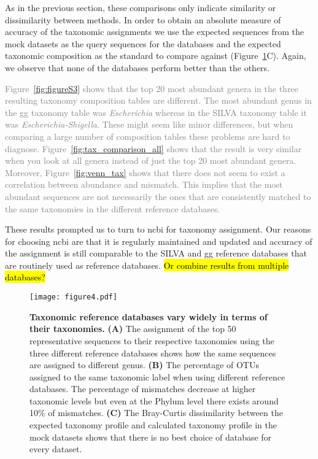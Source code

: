   As in the previous section, these comparisons only indicate similarity or dissimilarity between methods.
  In order to obtain an absolute measure of accuracy of the taxonomic assignments we use the expected sequences from the mock datasets as the query sequences for the databases and the expected taxonomic composition as the standard to compare against (Figure~\ref{fig:figure4}C).
  Again, we observe that none of the databases perform better than the others. 

  \textcolor{gray}{
    Figure~\ref{fig:figureS3} shows that the top 20 most abundant genera in the three resulting taxonomy composition tables are different.
    The most abundant genus in the \ac{gg} taxonomy table was \textit{Escherichia} whereas in the SILVA taxonomy table it was \textit{Escherichia-Shigella}.
    These might seem like minor differences, but when comparing a large number of composition tables these problems are hard to diagnose.
    Figure~\ref{fig:tax_comparison_all} shows that the result is very similar when you look at all genera instead of just the top 20 most abundant genera.
    Moreover, Figure~\ref{fig:venn_tax} shows that there does not seem to exist a correlation between abundance and mismatch.
    This implies that the most abundant sequences are not necessarily the ones that are consistently matched to the same taxonomies in the different reference databases.
  }

  These results prompted us to turn to \ac{ncbi} for taxonomy assignment.
  Our reasons for choosing \ac{ncbi} are that it is regularly maintained and updated and accuracy of the assignment is still comparable to the SILVA and \ac{gg} reference databases that are routinely used as reference databases.
  \hl{Or combine results from multiple databases?}

  \begin{figure}[h]
    \centering
    \texttt{[image: figure4.pdf]}
    \caption{
      \textbf{Taxonomic reference databases vary widely in terms of their taxonomies.}
      \textbf{(A)} The assignment of the top 50 representative sequences to their respective taxonomies using the three different reference databases shows how the same sequences are assigned to different genus.
      \textbf{(B)} The percentage of \ac{OTU}s assigned to the same taxonomic label when using different reference databases.
      The percentage of mismatches decrease at higher taxonomic levels but even at the Phylum level there exists around 10\% of mismatches.
      \textbf{(C)} The Bray-Curtis dissimilarity between the expected taxonomy profile and calculated taxonomy profile in the mock datasets shows that there is no best choice of database for every dataset.
    }
    \label{fig:figure4}
  \end{figure}

